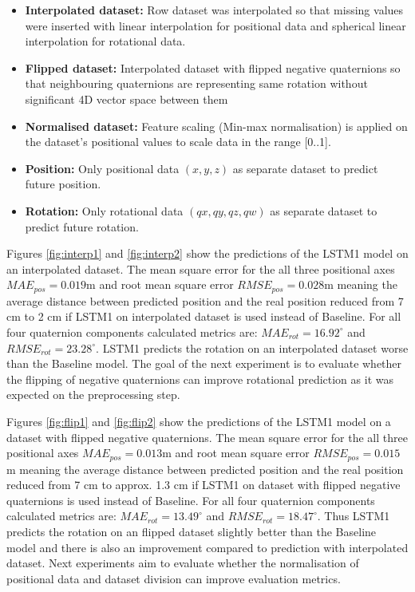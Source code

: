 \begin{itemize}
	\item \textbf{Interpolated dataset:} Row dataset was interpolated so that missing values were inserted with linear interpolation for positional data and spherical linear interpolation for rotational data. 
	\item \textbf{Flipped dataset:} Interpolated dataset with flipped negative quaternions so that neighbouring quaternions are representing same rotation without significant 4D vector space between them
	\item \textbf{Normalised dataset:} Feature scaling (Min-max normalisation) is applied on the dataset's positional values to scale data in the range [0..1]. 
	\item \textbf{Position:} Only positional data $(x, y, z)$ as separate dataset to predict future position. 
	\item \textbf{Rotation:} Only rotational data $(qx, qy, qz, qw)$ as separate dataset to predict future rotation. 
	
\end{itemize}



Figures \ref{fig:interp1} and \ref{fig:interp2} show the predictions of the LSTM1 model on an interpolated dataset. The mean square error for the all three positional axes $MAE_{pos} = 0.019$m and root mean square error $RMSE_{pos} = 0.028$m meaning the average distance between predicted position and the real position reduced from 7 cm to 2 cm if LSTM1 on interpolated dataset is used instead of Baseline. For all four quaternion components calculated metrics are: $MAE_{rot} = 16.92^{\circ}$ and $RMSE_{rot} =23.28^{\circ}$. LSTM1 predicts the rotation on an interpolated dataset worse than the Baseline model. The goal of the next experiment is to evaluate whether the flipping of negative quaternions can improve rotational prediction as it was expected on the preprocessing step.

Figures \ref{fig:flip1} and \ref{fig:flip2} show the predictions of the LSTM1 model on a dataset with flipped negative quaternions. The mean square error for the all three positional axes $MAE_{pos} = 0.013$m and root mean square error $RMSE_{pos} = 0.015$m meaning the average distance between predicted position and the real position reduced from 7 cm to approx. 1.3 cm if LSTM1 on dataset with flipped negative quaternions is used instead of Baseline. For all four quaternion components calculated metrics are: $MAE_{rot} = 13.49^{\circ}$ and $RMSE_{rot} =18.47^{\circ}$. Thus LSTM1 predicts the rotation on an flipped dataset slightly better than the Baseline model and there is also an improvement compared to prediction with interpolated dataset. Next experiments aim to evaluate whether the normalisation of positional data and dataset division can improve evaluation metrics. 

